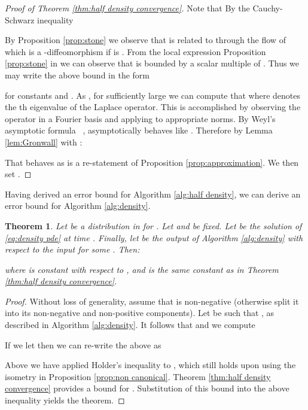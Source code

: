 \documentclass[final,leqno]{amsart}
\newtheorem{theorem}{Theorem}[section]
\begin{document}
\begin{proof}[Proof of Theorem \ref{thm:half density convergence}]
	Note that 
	By the Cauchy-Schwarz inequality
	
	By Proposition \ref{prop:stone} we observe that  is related to  through the flow of  which is a -diffeomorphism if  is .
	From the local expression Proposition \ref{prop:stone} in we can observe that  is bounded by a scalar multiple of .
	Thus we may write the above bound in the form
	
	for constants  and .
	As , for sufficiently large  we can compute that  where  denotes the th eigenvalue of the Laplace operator.
	This is accomplished by observing the operator  in a Fourier basis and applying to appropriate norms.
	By Weyl's asymptotic formula ~\cite[Theorem B.2]{Chavel1984},  asymptotically behaves like .
	Therefore by Lemma \ref{lem:Gronwall} with :
	
	That  behaves as  is a re-statement of Proposition \ref{prop:approximation}.
	We then set .
\end{proof}

Having derived an error bound for Algorithm \ref{alg:half density}, we can derive an error bound for Algorithm \ref{alg:density}.

\begin{theorem} \label{thm:density convergence}
	Let  be a distribution in  for .
	Let  and  be fixed.
	Let  be the solution of \eqref{eq:density pde} at time .
	Finally, let  be the output of Algorithm \ref{alg:density} with respect to the input  for some .
	Then:
	
	where  is constant with respect to , and  is the same constant as in Theorem \ref{thm:half density convergence}.
\end{theorem}

\begin{proof}
	Without loss of generality, assume that  is non-negative (otherwise split it into its non-negative and non-positive components).
	Let  be such that , as described in Algorithm \ref{alg:density}.
	It follows that  and we compute
	
	If we let  then we can re-write the above as
	
	Above we have applied Holder's inequality to , which still holds upon using the isometry in Proposition \ref{prop:non canonical}.
	Theorem \ref{thm:half density convergence} provides a bound for .
	Substitution of this bound into the above inequality yields the theorem.
\end{proof}
\end{document}
